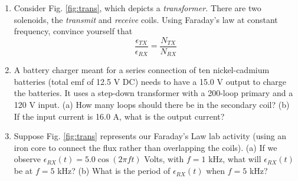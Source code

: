\documentclass{article}
\begin{document}
\begin{enumerate}
\item Consider Fig. \ref{fig:trans}, which depicts a \textit{transformer.}  There are two solenoids, the \textit{transmit} and \textit{receive} coils.  Using Faraday's law at constant frequency, convince yourself that
\begin{equation}
\frac{\epsilon_{TX}}{\epsilon_{RX}} = \frac{N_{TX}}{N_{RX}}
\end{equation}
\item A battery charger meant for a series connection of ten nickel-cadmium batteries (total emf of 12.5 V DC) needs to have a 15.0 V output to charge the batteries. It uses a step-down transformer with a 200-loop primary and a 120 V input. (a) How many loops should there be in the secondary coil? (b) If the input current is 16.0 A, what is the output current? \\ \vspace{2cm}
\item Suppose Fig. \ref{fig:trans} represents our Faraday's Law lab activity (using an iron core to connect the flux rather than overlapping the coils).  (a) If we observe $\epsilon_{RX}(t) = 5.0\cos(2\pi ft)$ Volts, with $f = 1$ kHz, what will $\epsilon_{RX}(t)$ be at $f = 5$ kHz? (b) What is the period of $\epsilon_{RX}(t)$ when $f = 5$ kHz?
\end{enumerate}
\end{document}
